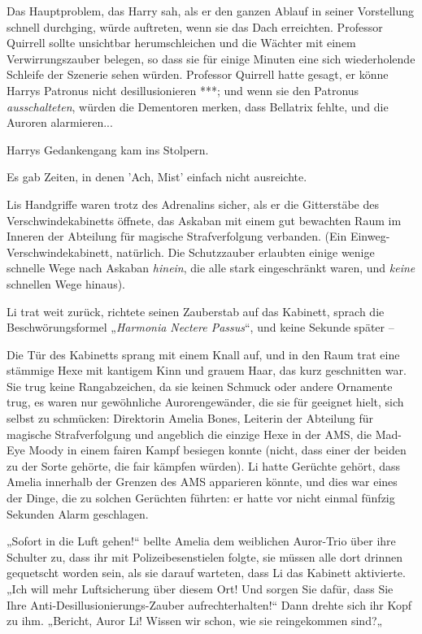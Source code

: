 {Das Hauptproblem, das Harry sah, als er den ganzen Ablauf in seiner Vorstellung schnell durchging, würde auftreten, wenn sie das Dach erreichten. Professor Quirrell sollte unsichtbar herumschleichen und die Wächter mit einem Verwirrungszauber belegen, so dass sie für einige Minuten eine sich wiederholende Schleife der Szenerie sehen würden. Professor Quirrell hatte gesagt, er könne Harrys Patronus nicht desillusionieren ***; und wenn sie den Patronus \emph{ausschalteten}, würden die Dementoren merken, dass Bellatrix fehlte, und die Auroren alarmieren...

Harrys Gedankengang kam ins Stolpern.

Es gab Zeiten, in denen 'Ach, Mist' einfach nicht ausreichte.

Lis Handgriffe waren trotz des Adrenalins sicher, als er die Gitterstäbe des Verschwindekabinetts öffnete, das Askaban mit einem gut bewachten Raum im Inneren der Abteilung für magische Strafverfolgung verbanden. (Ein Einweg-Verschwindekabinett, natürlich. Die Schutzzauber erlaubten einige wenige schnelle Wege nach Askaban \emph{hinein}, die alle stark eingeschränkt waren, und \emph{keine} schnellen Wege hinaus).

Li trat weit zurück, richtete seinen Zauberstab auf das Kabinett, sprach die Beschwörungsformel „\emph{Harmonia Nectere Passus}“, und keine Sekunde später --

Die Tür des Kabinetts sprang mit einem Knall auf, und in den Raum trat eine stämmige Hexe mit kantigem Kinn und grauem Haar, das kurz geschnitten war. Sie trug keine Rangabzeichen, da sie keinen Schmuck oder andere Ornamente trug, es waren nur gewöhnliche Aurorengewänder, die sie für geeignet hielt, sich selbst zu schmücken: Direktorin Amelia Bones, Leiterin der Abteilung für magische Strafverfolgung und angeblich die einzige Hexe in der AMS, die Mad-Eye Moody in einem fairen Kampf besiegen konnte (nicht, dass einer der beiden zu der Sorte gehörte, die fair kämpfen würden). Li hatte Gerüchte gehört, dass Amelia innerhalb der Grenzen des AMS apparieren könnte, und dies war eines der Dinge, die zu solchen Gerüchten führten: er hatte vor nicht einmal fünfzig Sekunden Alarm geschlagen.

„Sofort in die Luft gehen!“ bellte Amelia dem weiblichen Auror-Trio über ihre Schulter zu, dass ihr mit Polizeibesenstielen folgte, sie müssen alle dort drinnen gequetscht worden sein, als sie darauf warteten, dass Li das Kabinett aktivierte. „Ich will mehr Luftsicherung über diesem Ort! Und sorgen Sie dafür, dass Sie Ihre Anti-Desillusionierungs-Zauber aufrechterhalten!“ Dann drehte sich ihr Kopf zu ihm. „Bericht, Auror Li! Wissen wir schon, wie sie reingekommen sind?„

}
